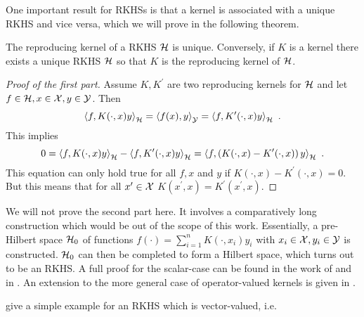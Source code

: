 One important result for RKHSs is that a kernel is associated with a unique RKHS and vice versa, which we will prove in the following theorem.
\begin{theorem}
	\label{theo:kernel-for-rkhs}
	The reproducing kernel of a RKHS $\mathcal{H}$ is unique.
	Conversely, if $K$ is a kernel there exists a unique RKHS $\mathcal{H}$ so that $K$ is the reproducing kernel of $\mathcal{H}$.
\end{theorem}
\begin{proof}[Proof of the first part]
	Assume $K, K^\prime$ are two reproducing kernels for $\mathcal{H}$ and let $f \in \mathcal{H}, x \in \mathcal{X}, y \in \mathcal{Y}$.
	Then
	\begin{equation}
		\left< f, K(\cdot, x)y\right>_{\mathcal{H}} = \left<f(x), y\right>_{\mathcal{Y}} = \left<f, K^\prime(\cdot, x) y\right>_{\mathcal{H}} \ .
	\end{equation}
	This implies
	\begin{equation}
		0 = \left< f, K(\cdot, x)y\right>_{\mathcal{H}} - \left< f, K^\prime(\cdot, x)y\right>_{\mathcal{H}}
		= \left< f, \left(K(\cdot, x) - K^\prime(\cdot, x)\right)y\right>_{\mathcal{H}} \ .
	\end{equation}
	This equation can only hold true for all $f, x$ and $y$ if $K(\cdot, x) - K^\prime(\cdot, x) = 0$.
	But this means that for all $x^\prime \in \mathcal{X}$ $K(x^\prime, x) = K^\prime(x^\prime, x)$.	
\end{proof}

We will not prove the second part here.
It involves a comparatively long construction which would be out of the scope of this work.
Essentially, a pre-Hilbert space $\mathcal{H}_0$ of functions $f(\cdot) = \sum_{i=1}^n K(\cdot, x_i) y_i$ with $x_i \in \mathcal{X}, y_i \in \mathcal{Y}$ is constructed.
$\mathcal{H}_0$ can then be completed to form a Hilbert space, which turns out to be an RKHS.
A full proof for the scalar-case can be found in the work of \citet{aronszajn50} and in \cite{sejdinovic12, berlinet04}.
An extension to the more general case of operator-valued kernels is given in \cite{kadri16}.

\citet{kadri16} give a simple example for an RKHS which is vector-valued, i.e. 
\begin{example}
	
\end{example}